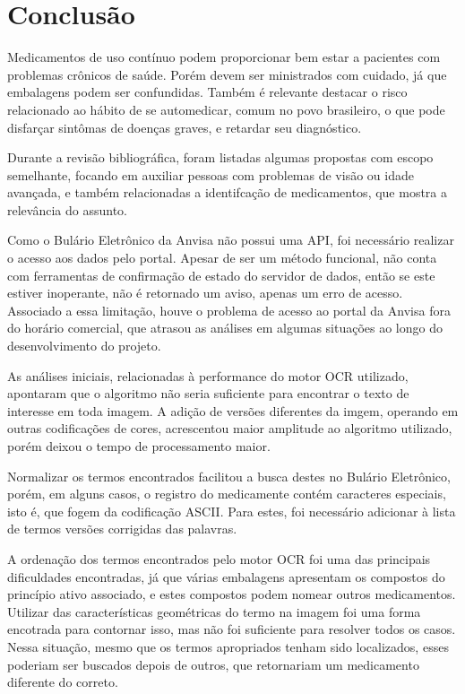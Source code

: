 \chapter{Conclusão}\label{cap:conclusao}

Medicamentos de uso contínuo podem proporcionar bem estar a pacientes com problemas crônicos de saúde.
Porém devem ser ministrados com cuidado, já que embalagens podem ser confundidas.
Também é relevante destacar o risco relacionado ao hábito de se automedicar, comum no povo brasileiro, o que pode disfarçar sintômas de doenças graves, e retardar seu diagnóstico.

Durante a revisão bibliográfica, foram listadas algumas propostas com escopo semelhante, focando em auxiliar pessoas com problemas de visão ou idade avançada, e também relacionadas a identifcação de medicamentos, que mostra a relevância do assunto.

Como o Bulário Eletrônico da \ac{Anvisa} não possui uma \ac{API}, foi necessário realizar o acesso aos dados pelo portal.
Apesar de ser um método funcional, não conta com ferramentas de confirmação de estado do servidor de dados, então se este estiver inoperante, não é retornado um aviso, apenas um erro de acesso.
Associado a essa limitação, houve o problema de acesso ao portal da \ac{Anvisa} fora do horário comercial, que atrasou as análises em algumas situações ao longo do desenvolvimento do projeto.

As análises iniciais, relacionadas à performance do motor \ac{OCR} utilizado, apontaram que o algoritmo não seria suficiente para encontrar o texto de interesse em toda imagem.
A adição de versões diferentes da imgem, operando em outras codificações de cores, acrescentou maior amplitude ao algoritmo utilizado, porém deixou o tempo de processamento maior.

Normalizar os termos encontrados facilitou a busca destes no Bulário Eletrônico, porém, em alguns casos, o registro do medicamente contém caracteres especiais, isto é, que fogem da codificação \ac{ASCII}.
Para estes, foi necessário adicionar à lista de termos versões corrigidas das palavras.

A ordenação dos termos encontrados pelo motor \ac{OCR} foi uma das principais dificuldades encontradas, já que várias embalagens apresentam os compostos do princípio ativo associado, e estes compostos podem nomear outros medicamentos.
Utilizar das características geométricas do termo na imagem foi uma forma encotrada para contornar isso, mas não foi suficiente para resolver todos os casos.
Nessa situação, mesmo que os termos apropriados tenham sido localizados, esses poderiam ser buscados depois de outros, que retornariam um medicamento diferente do correto.

